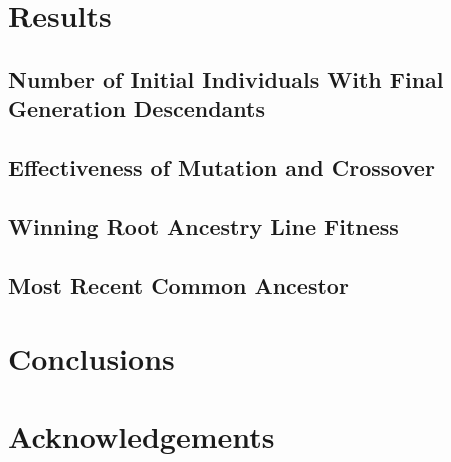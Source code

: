 \documentclass[12pt]{article}
\begin{document}
\section{Results} \label{Results}

\subsection{Number of Initial Individuals With Final Generation Descendants} \label{Number Initial Individuals 
With Descendants}

\subsection{Effectiveness of Mutation and Crossover} \label{Effectiveness Mutation Crossover}

\subsection{Winning Root Ancestry Line Fitness} \label{Winning Root Line Fitness}

\subsection{Most Recent Common Ancestor} \label{Most Recent Common Ancestor}

\section{Conclusions} \label{Conclusions}

\section*{Acknowledgements}

\pagebreak



\end{document}
